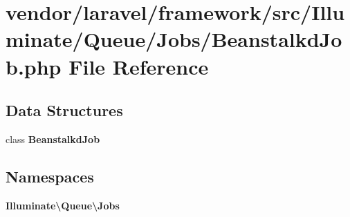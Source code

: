 \section{vendor/laravel/framework/src/\+Illuminate/\+Queue/\+Jobs/\+Beanstalkd\+Job.php File Reference}
\label{_beanstalkd_job_8php}
\subsection*{Data Structures}
\begin{DoxyCompactItemize}
\item 
class {\bf Beanstalkd\+Job}
\end{DoxyCompactItemize}
\subsection*{Namespaces}
\begin{DoxyCompactItemize}
\item 
 {\bf Illuminate\textbackslash{}\+Queue\textbackslash{}\+Jobs}
\end{DoxyCompactItemize}

